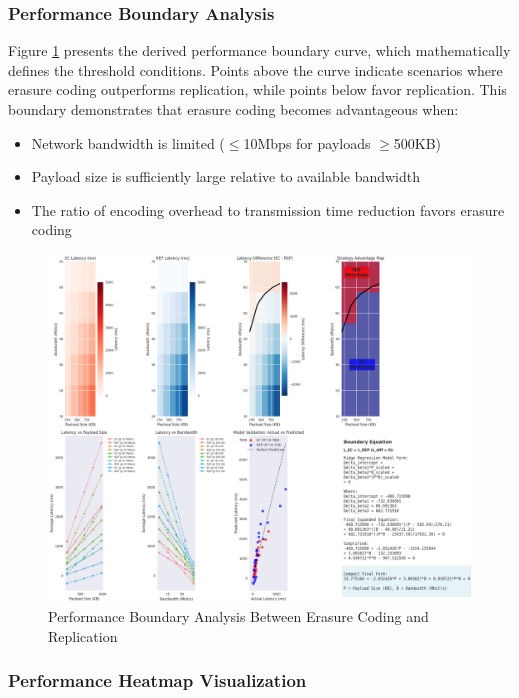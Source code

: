 \subsubsection{Performance Boundary Analysis}

Figure \ref{fig:performance-boundary} presents the derived performance boundary curve, which mathematically defines the threshold conditions. Points above the curve indicate scenarios where erasure coding outperforms replication, while points below favor replication. This boundary demonstrates that erasure coding becomes advantageous when:
\begin{itemize}
\item Network bandwidth is limited ($\leq$10Mbps for payloads $\geq$500KB)
\item Payload size is sufficiently large relative to available bandwidth
\item The ratio of encoding overhead to transmission time reduction favors erasure coding
\end{itemize}

\begin{figure}[ht]
    \centering
    \includegraphics[width=\columnwidth]{resources/chapter-4/write_bigload_avgnet_boundary.png}
    \caption{Performance Boundary Analysis Between Erasure Coding and Replication}
    \label{fig:performance-boundary}
\end{figure}

\subsubsection{Performance Heatmap Visualization}

